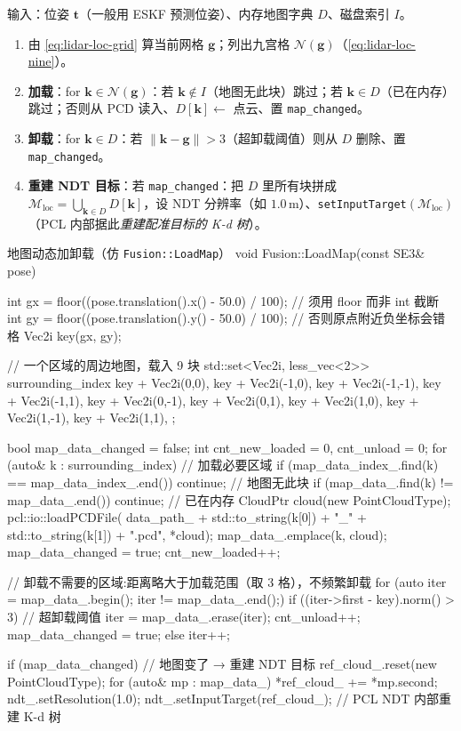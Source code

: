 \begin{algo}\label{alg:lidar-loc-loadmap}
输入：位姿 $\mathbf t$（一般用 ESKF 预测位姿）、内存地图字典 $D$、磁盘索引 $I$。
\begin{enumerate}
  \item 由 \cref{eq:lidar-loc-grid} 算当前网格 $\mathbf g$；列出九宫格 $\mathcal N(\mathbf g)$（\cref{eq:lidar-loc-nine}）。
  \item \textbf{加载}：for $\mathbf k\in\mathcal N(\mathbf g)$：若 $\mathbf k\notin I$（地图无此块）跳过；若 $\mathbf k\in D$（已在内存）跳过；否则从 PCD 读入、$D[\mathbf k]\!\leftarrow$ 点云、置 \texttt{map\_changed}。
  \item \textbf{卸载}：for $\mathbf k\in D$：若 $\|\mathbf k-\mathbf g\| > 3$（超卸载阈值）则从 $D$ 删除、置 \texttt{map\_changed}。
  \item \textbf{重建 NDT 目标}：若 \texttt{map\_changed}：把 $D$ 里所有块拼成 $\mathcal M_{\mathrm{loc}}=\bigcup_{\mathbf k\in D}D[\mathbf k]$，设 NDT 分辨率（如 $1.0$\,m）、\texttt{setInputTarget}$(\mathcal M_{\mathrm{loc}})$（PCL 内部据此\emph{重建配准目标的 K-d 树}）。
\end{enumerate}
\end{algo}

\begin{codebox}[C++]{地图动态加卸载（仿 \texttt{Fusion::LoadMap}）}
void Fusion::LoadMap(const SE3& pose) {
  int gx = floor((pose.translation().x() - 50.0) / 100);  // 须用 floor 而非 int 截断
  int gy = floor((pose.translation().y() - 50.0) / 100);  // 否则原点附近负坐标会错格
  Vec2i key(gx, gy);

  // 一个区域的周边地图，载入 9 块
  std::set<Vec2i, less_vec<2>> surrounding_index{
    key + Vec2i(0,0),  key + Vec2i(-1,0), key + Vec2i(-1,-1), key + Vec2i(-1,1),
    key + Vec2i(0,-1), key + Vec2i(0,1),  key + Vec2i(1,0),
    key + Vec2i(1,-1), key + Vec2i(1,1),
  };

  bool map_data_changed = false;
  int cnt_new_loaded = 0, cnt_unload = 0;
  for (auto& k : surrounding_index) {                  // 加载必要区域
    if (map_data_index_.find(k) == map_data_index_.end()) continue;  // 地图无此块
    if (map_data_.find(k) != map_data_.end()) continue;              // 已在内存
    CloudPtr cloud(new PointCloudType);
    pcl::io::loadPCDFile(
        data_path_ + std::to_string(k[0]) + "_" + std::to_string(k[1]) + ".pcd", *cloud);
    map_data_.emplace(k, cloud);
    map_data_changed = true; cnt_new_loaded++;
  }

  // 卸载不需要的区域:距离略大于加载范围（取 3 格），不频繁卸载
  for (auto iter = map_data_.begin(); iter != map_data_.end();) {
    if ((iter->first - key).norm() > 3) {              // 超卸载阈值
      iter = map_data_.erase(iter);
      cnt_unload++; map_data_changed = true;
    } else { iter++; }
  }

  if (map_data_changed) {                              // 地图变了 → 重建 NDT 目标
    ref_cloud_.reset(new PointCloudType);
    for (auto& mp : map_data_) { *ref_cloud_ += *mp.second; }
    ndt_.setResolution(1.0);
    ndt_.setInputTarget(ref_cloud_);                   // PCL NDT 内部重建 K-d 树
  }
}
\end{codebox}

